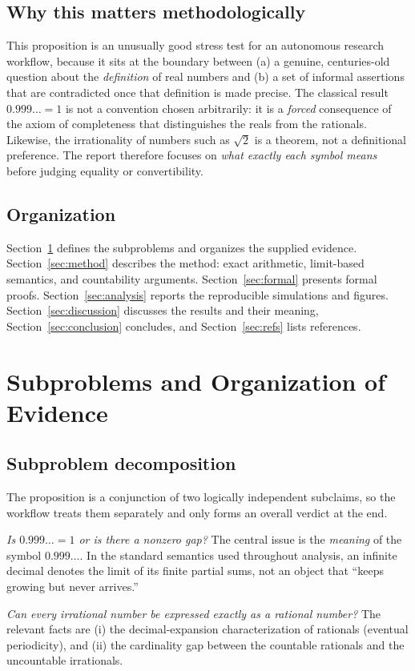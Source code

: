 \documentclass[11pt,a4paper]{article}
\begin{document}
\subsection{Why this matters methodologically}
This proposition is an unusually good stress test for an autonomous research
workflow, because it sits at the boundary between (a) a genuine, centuries-old
question about the \emph{definition} of real numbers and (b) a set of informal
assertions that are contradicted once that definition is made precise. The
classical result $0.999\ldots = 1$ is not a convention chosen arbitrarily: it is
a \emph{forced} consequence of the axiom of completeness that distinguishes the
reals from the rationals. Likewise, the irrationality of numbers such as
$\sqrt{2}$ is a theorem, not a definitional preference. The report therefore
focuses on \emph{what exactly each symbol means} before judging equality or
convertibility.

\subsection{Organization}
Section~\ref{sec:subproblems} defines the subproblems and organizes the supplied
evidence. Section~\ref{sec:method} describes the method: exact arithmetic,
limit-based semantics, and countability arguments. Section~\ref{sec:formal}
presents formal proofs. Section~\ref{sec:analysis} reports the reproducible
simulations and figures. Section~\ref{sec:discussion} discusses the results and
their meaning, Section~\ref{sec:conclusion} concludes, and
Section~\ref{sec:refs} lists references.


\section{Subproblems and Organization of Evidence}
\label{sec:subproblems}

\subsection{Subproblem decomposition}
The proposition is a conjunction of two logically independent subclaims, so the
workflow treats them separately and only forms an overall verdict at the end.

\begin{description}[style=nextline]
  \item[Subproblem A (identity of $0.999\ldots$)] \emph{Is
        $0.999\ldots = 1$ or is there a nonzero gap?} The central issue is the
        \emph{meaning} of the symbol $0.999\ldots$. In the standard semantics
        used throughout analysis, an infinite decimal denotes the limit of its
        finite partial sums, not an object that ``keeps growing but never
        arrives.''
  \item[Subproblem B (convertibility of irrationals)] \emph{Can every
        irrational number be expressed exactly as a rational number?} The
        relevant facts are (i) the decimal-expansion characterization of
        rationals (eventual periodicity), and (ii) the cardinality gap between
        the countable rationals and the uncountable irrationals.
\end{description}
\end{document}
